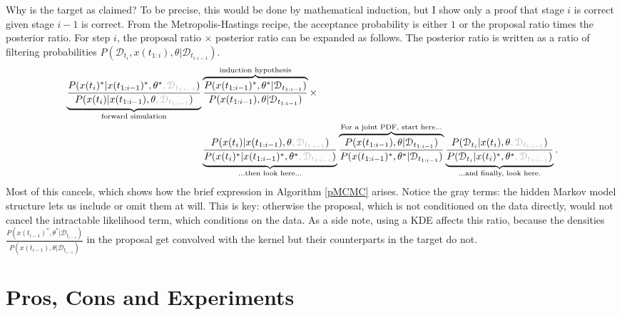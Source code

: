 \documentclass{article}
\begin{document}
\pagebreak
Why is the target as claimed? To be precise, this would be done by mathematical induction, but I show only a proof that stage $i$ is correct given stage $i-1$ is correct. From the Metropolis-Hastings recipe, the acceptance probability is either $1$ or the proposal ratio times the posterior ratio. For step $i$, the proposal ratio $\times$ posterior ratio can be expanded as follows. The posterior ratio is written as a ratio of filtering probabilities $P(\mathcal{D}_{t_{i}}, x(t_{1:i}), \theta|\mathcal{D}_{t_{i:i-1}})$.
\begin{align*}
\underbrace{\frac{P(x(t_{i})^*| x(t_{1:i-1})^*,\theta^*\gray{, \mathcal{D}_{t_{1:i-1}}})}{P(x(t_{i})| x(t_{1:i-1}), \theta \gray{, \mathcal{D}_{t_{1:i-1}}})}}_{\text{forward simulation}}
%
&\overbrace{\frac{P(x(t_{1:i-1})^*,\theta^*| \mathcal{D}_{t_{1:i-1}})}{P(x(t_{1:i-1}), \theta| \mathcal{D}_{t_{1:i-1}})}}^{\text{induction hypothesis}}
%
\times \\
%
&\underbrace{\frac{P(x(t_{i})| x(t_{1:i-1}), \theta \gray{, \mathcal{D}_{t_{1:i-1}}})}{P(x(t_{i})^*| x(t_{1:i-1})^*,\theta^*\gray{, \mathcal{D}_{t_{1:i-1}}})}}_{\text{...then look here...}}
%
\overbrace{\frac{ P(x(t_{1:i-1}), \theta| \mathcal{D}_{t_{1:i-1}})}{ P( x(t_{1:i-1})^*,\theta^*| \mathcal{D}_{t_{1:i-1}})} }^{\text{For a joint PDF, start here...}}
%  
\underbrace{\frac{P(\mathcal{D}_{t_{i}}|x(t_{i}), \theta\gray{, \mathcal{D}_{t_{1:i-1}}})}{P(\mathcal{D}_{t_{i}}|x(t_{i})^*, \theta^*\gray{, \mathcal{D}_{t_{1:i-1}}})}}_{\text{...and finally, look here.}}
%
.\end{align*} 
Most of this cancels, which shows how the brief expression in Algorithm \ref{pMCMC} arises. Notice the gray terms: the hidden Markov model structure lets us include or omit them at will. This is key: otherwise the proposal, which is not conditioned on the data directly, would not cancel the intractable likelihood term, which conditions on the data. As a side note, using a KDE affects this ratio, because the densities $\frac{P(x(t_{i-1})^*,\theta^*| \mathcal{D}_{t_{i-1}})}{P(x(t_{i-1}), \theta| \mathcal{D}_{t_{i-1}})}$ in the proposal get convolved with the kernel but their counterparts in the target do not.%

\section{Pros, Cons and Experiments}
\end{document}
